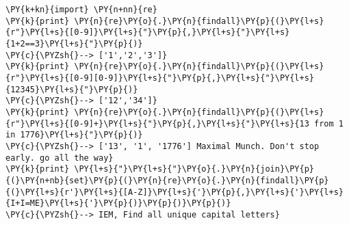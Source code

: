 \begin{Verbatim}[commandchars=\\\{\}]
\PY{k+kn}{import} \PY{n+nn}{re}
\PY{k}{print} \PY{n}{re}\PY{o}{.}\PY{n}{findall}\PY{p}{(}\PY{l+s}{r"}\PY{l+s}{[0-9]}\PY{l+s}{"}\PY{p}{,}\PY{l+s}{"}\PY{l+s}{1+2==3}\PY{l+s}{"}\PY{p}{)}
\PY{c}{\PYZsh{}--> ['1','2','3']}
\PY{k}{print} \PY{n}{re}\PY{o}{.}\PY{n}{findall}\PY{p}{(}\PY{l+s}{r"}\PY{l+s}{[0-9][0-9]}\PY{l+s}{"}\PY{p}{,}\PY{l+s}{"}\PY{l+s}{12345}\PY{l+s}{"}\PY{p}{)}
\PY{c}{\PYZsh{}--> ['12','34']}
\PY{k}{print} \PY{n}{re}\PY{o}{.}\PY{n}{findall}\PY{p}{(}\PY{l+s}{r"}\PY{l+s}{[0-9]+}\PY{l+s}{"}\PY{p}{,}\PY{l+s}{"}\PY{l+s}{13 from 1 in 1776}\PY{l+s}{"}\PY{p}{)}
\PY{c}{\PYZsh{}--> ['13', '1', '1776'] Maximal Munch. Don't stop early. go all the way}
\PY{k}{print} \PY{l+s}{"}\PY{l+s}{"}\PY{o}{.}\PY{n}{join}\PY{p}{(}\PY{n+nb}{set}\PY{p}{(}\PY{n}{re}\PY{o}{.}\PY{n}{findall}\PY{p}{(}\PY{l+s}{r'}\PY{l+s}{[A-Z]}\PY{l+s}{'}\PY{p}{,}\PY{l+s}{'}\PY{l+s}{I+I=ME}\PY{l+s}{'}\PY{p}{)}\PY{p}{)}\PY{p}{)}
\PY{c}{\PYZsh{}--> IEM, Find all unique capital letters}
\end{Verbatim}
